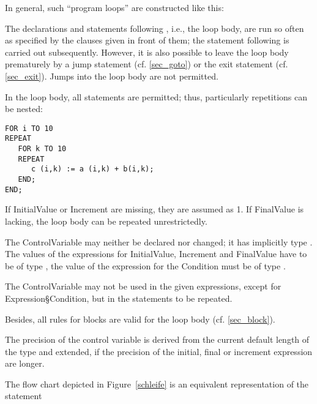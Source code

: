 In general, such ``program loops'' are constructed like this:

\begin{grammarframe}

\end{grammarframe}
The declarations and statements following , i.e., the loop body,
are run so often as specified by the clauses given in front of them; the
statement following  is carried out subsequently. However, it is also
possible to leave the loop body prematurely by a jump statement (cf. \ref{sec_goto})
or the exit statement (cf. \ref{sec_exit}). Jumps into the loop body are not permitted.

In the loop body, all statements are permitted; thus, particularly
repetitions can be nested:

\begin{lstlisting}
FOR i TO 10
REPEAT
   FOR k TO 10 
   REPEAT 
      c (i,k) := a (i,k) + b(i,k);
   END;
END;
\end{lstlisting}

If InitialValue or Increment are missing, they are assumed as 1. 
If FinalValue is lacking, the loop body can be repeated unrestrictedly.

The ControlVariable may neither be declared nor changed; it has
implicitly type . The values of the expressions for InitialValue,
Increment and FinalValue have to be of type , the value of the
expression for the Condition must be of type .

The ControlVariable may not be used in the given expressions, except
for Expression\S Condition, but in the statements to be repeated.

Besides, all rules for blocks are valid for the loop body (cf. \ref{sec_block}).

The precision of the control variable is derived from the current default
 length of the type  and extended,
 if the precision of the initial, final or increment expression are longer.

The flow chart depicted in Figure~\ref{schleife} is an equivalent representation of the
statement

